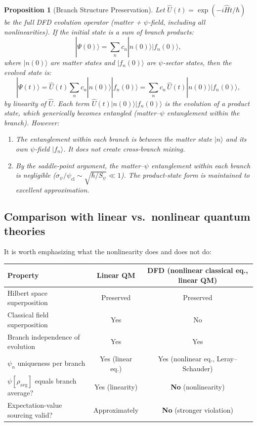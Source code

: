 \documentclass[12pt,a4paper]{article}
\newtheorem{proposition}[theorem]{Proposition}
\begin{document}
\begin{proposition}[Branch Structure Preservation]
\label{prop:branch-structure}
Let $\hat{U}(t) = \exp(-i\hat{H}t/\hbar)$ be the full DFD evolution
operator (matter + $\psi$-field, including all nonlinearities). If the
initial state is a sum of branch products:
\begin{equation}
|\Psi(0)\rangle = \sum_n c_n |n(0)\rangle|f_n(0)\rangle,
\end{equation}
where $|n(0)\rangle$ are matter states and $|f_n(0)\rangle$ are
$\psi$-sector states, then the evolved state is:
\begin{equation}
|\Psi(t)\rangle = \hat{U}(t)\sum_n c_n |n(0)\rangle|f_n(0)\rangle
= \sum_n c_n\,\hat{U}(t)|n(0)\rangle|f_n(0)\rangle,
\end{equation}
by linearity of $\hat{U}$. Each term
$\hat{U}(t)|n(0)\rangle|f_n(0)\rangle$ is the evolution of a product
state, which generically becomes entangled (matter--$\psi$ entanglement
\emph{within} the branch). However:
\begin{enumerate}
\item The entanglement within each branch is between the matter state
$|n\rangle$ and its \emph{own} $\psi$-field $|f_n\rangle$. It does not
create cross-branch mixing.

\item By the saddle-point argument, the matter--$\psi$ entanglement
within each branch is negligible ($\sigma_\psi/\psi_\mathrm{cl}
\sim \sqrt{\hbar/S_\psi} \ll 1$). The product-state form is maintained
to excellent approximation.
\end{enumerate}
\end{proposition}

\subsection{Comparison with linear vs.\ nonlinear quantum theories}

It is worth emphasizing what the nonlinearity does and does not do:

\begin{center}
\renewcommand{\arraystretch}{1.3}
\begin{tabular}{>{\raggedright}p{5.5cm}cc}
\toprule
\textbf{Property} & \textbf{Linear QM} & \textbf{DFD (nonlinear classical
eq.,} \textbf{linear QM)} \\
\midrule
Hilbert space superposition & Preserved & Preserved \\
Classical field superposition & Yes & No \\
Branch independence of evolution & Yes & Yes \\
$\psi_n$ uniqueness per branch & Yes (linear eq.) & Yes (nonlinear eq.,
Leray--Schauder) \\
$\psi[\rho_\mathrm{avg}]$ equals branch average? & Yes (linearity)
& \textbf{No} (nonlinearity) \\
Expectation-value sourcing valid? & Approximately & \textbf{No}
(stronger violation) \\
\bottomrule
\end{tabular}
\end{center}
\end{document}
